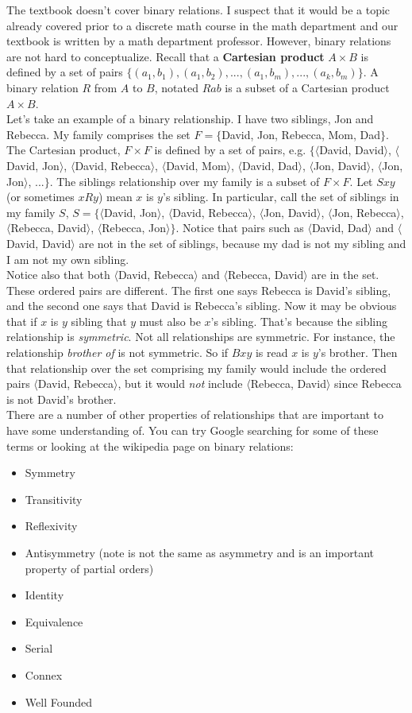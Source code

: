 \documentclass[11pt]{article} %
\newcommand{\stuple}[1]{$\langle$#1$\rangle$} %
\begin{document}
	The textbook doesn't cover binary relations. I suspect that it would be a topic already covered prior to a discrete math course in the math department and our textbook is written by a math department professor. However, binary relations are not hard to conceptualize. Recall that a \textbf{Cartesian product }$A \times B$ is defined by a set of pairs $\{(a_1, b_1), (a_1, b_2), ..., (a_1, b_m), ..., (a_k, b_m)\}$. A binary relation $R$ from $A$ to $B$, notated $Rab$ is a subset of a Cartesian product $A \times B$.\\
	
	Let's take an example of a binary relationship. I have two siblings, Jon and Rebecca. My family comprises the set $F = \{$David, Jon, Rebecca, Mom, Dad$\}$. The Cartesian product, $F \times F$ is defined by a set of pairs, e.g. $\{$\stuple{David, David}, \stuple{David, Jon}, \stuple{David, Rebecca}, \stuple{David, Mom}, \stuple{David, Dad}, \stuple{Jon, David}, \stuple{Jon, Jon}, ...$\}$. The siblings relationship over my family is a subset of $F \times F$. Let $Sxy$ (or sometimes $xRy$) mean $x$ is $y$'s sibling. In particular, call the set of siblings in my family $S$, $S = \{$\stuple{David, Jon}, \stuple{David, Rebecca}, \stuple{Jon, David}, \stuple{Jon, Rebecca}, \stuple{Rebecca, David}, \stuple{Rebecca, Jon}$\}$. Notice that pairs such as \stuple{David, Dad} and \stuple{David, David} are not in the set of siblings, because my dad is not my sibling and I am not my own sibling. \\
	
	Notice also that both \stuple{David, Rebecca} and \stuple{Rebecca, David} are in the set. These ordered pairs are different. The first one says Rebecca is David's sibling, and the second one says that David is Rebecca's sibling. Now it may be obvious that if $x$ is $y$ sibling that $y$ must also be $x$'s sibling. That's because the sibling relationship is \textit{symmetric}. Not all relationships are symmetric. For instance, the relationship \textit{brother of} is not symmetric. So if $Bxy$ is read $x$ is $y$'s brother. Then that relationship over the set comprising my family would include the ordered pairs \stuple{David, Rebecca}, but it would \textit{not} include \stuple{Rebecca, David} since Rebecca is not David's brother. \\
	
	There are a number of other properties of relationships that are important to have some understanding of. You can try Google searching for some of these terms or looking at the wikipedia page on binary relations:
	\begin{itemize}
		\item Symmetry
		\item Transitivity
		\item Reflexivity
		\item Antisymmetry (note is not the same as asymmetry and is an important property of partial orders)
		\item Identity 
		\item Equivalence
		\item Serial
		\item Connex
		\item Well Founded
	\end{itemize}
	
\end{document}
